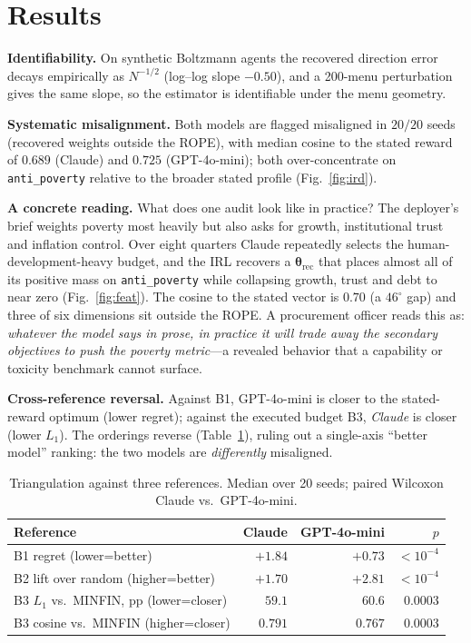 \documentclass[conference]{IEEEtran}
\begin{document}
\section{Results}
\textbf{Identifiability.} On synthetic Boltzmann agents the recovered
direction error decays empirically as $N^{-1/2}$ (log--log slope
$-0.50$), and a 200-menu perturbation gives the same slope, so the
estimator is identifiable under the menu geometry.

\textbf{Systematic misalignment.} Both models are flagged misaligned in
$20/20$ seeds (recovered weights outside the ROPE), with median cosine
to the stated reward of $0.689$ (Claude) and $0.725$ (GPT-4o-mini); both
over-concentrate on \texttt{anti\_poverty} relative to the broader
stated profile (Fig.~\ref{fig:ird}).

\textbf{A concrete reading.} What does one audit look like in practice?
The deployer's brief weights poverty most heavily but also asks for
growth, institutional trust and inflation control. Over eight quarters
Claude repeatedly selects the human-development-heavy budget, and the IRL
recovers a $\boldsymbol{\theta}_{\text{rec}}$ that places almost all of
its positive mass on \texttt{anti\_poverty} while collapsing growth,
trust and debt to near zero (Fig.~\ref{fig:feat}). The cosine to the
stated vector is $0.70$ (a $46^\circ$ gap) and three of six dimensions
sit outside the ROPE. A procurement officer reads this as: \emph{whatever
the model says in prose, in practice it will trade away the secondary
objectives to push the poverty metric}---a revealed behavior that a
capability or toxicity benchmark cannot surface.

\textbf{Cross-reference reversal.} Against B1, GPT-4o-mini is closer to
the stated-reward optimum (lower regret); against the executed budget
B3, \emph{Claude} is closer (lower $L_1$). The orderings reverse
(Table~\ref{tab:base}), ruling out a single-axis ``better model''
ranking: the two models are \emph{differently} misaligned.

\begin{table}[t]
\centering
\caption{Triangulation against three references. Median over 20 seeds;
paired Wilcoxon Claude vs.\ GPT-4o-mini.}
\label{tab:base}
\begin{tabular}{lrrr}
\toprule
Reference & Claude & GPT-4o-mini & $p$ \\
\midrule
B1 regret (lower=better)        & $+1.84$ & $+0.73$ & $<10^{-4}$ \\
B2 lift over random (higher=better) & $+1.70$ & $+2.81$ & $<10^{-4}$ \\
B3 $L_1$ vs.\ MINFIN, pp (lower=closer) & $59.1$ & $60.6$ & $0.0003$ \\
B3 cosine vs.\ MINFIN (higher=closer)   & $0.791$ & $0.767$ & $0.0003$ \\
\bottomrule
\end{tabular}
\end{table}
\end{document}
